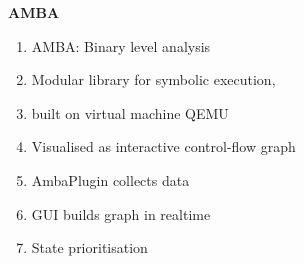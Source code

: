 \begin{frame}

	\begin{columns}[t]
		\begin{column}{0.4\textwidth}
			\textbf{AMBA}
			\small
			\begin{enumerate}
                \item AMBA: Binary level analysis
				\item Modular library for symbolic execution, \stoe{}
				\item \stoe{} built on virtual machine QEMU
                \item Visualised as interactive control-flow graph
                \item AmbaPlugin collects data
                \item GUI builds graph in realtime
                \item State prioritisation
			\end{enumerate}
		\end{column}
	\end{columns}
\end{frame}
